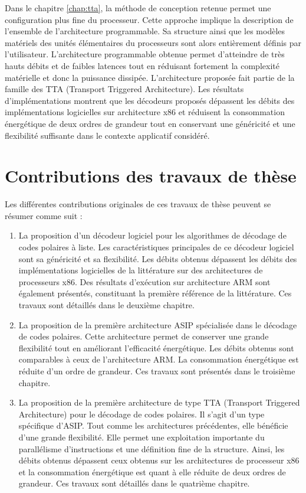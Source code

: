 Dans le chapitre \ref{chap:tta}, la méthode de conception retenue permet une configuration plus fine du processeur. Cette approche implique la description de l'ensemble de l'architecture programmable. Sa structure ainsi que les modèles matériels des unités élémentaires du processeurs sont alors entièrement définis par l'utilisateur. L'architecture programmable obtenue permet d'atteindre de très hauts débits et de faibles latences tout en réduisant fortement la complexité matérielle et donc la puissance dissipée. L'architecture proposée fait partie de la famille des TTA (Transport Triggered Architecture). Les résultats d'implémentations montrent que les décodeurs proposés dépassent les débits des implémentations logicielles sur architecture x86 et réduisent la consommation énergétique de deux ordres de grandeur tout en conservant une généricité et une flexibilité suffisante dans le contexte applicatif considéré.

\section*{Contributions des travaux de thèse}
Les différentes contributions originales de ces travaux de thèse peuvent se résumer comme suit : 
\begin{enumerate}
	\item La proposition d'un décodeur logiciel pour les algorithmes de décodage de codes polaires à liste. Les caractéristiques principales de ce décodeur logiciel sont sa généricité et sa flexibilité. Les débits obtenus dépassent les débits des implémentations logicielles de la littérature sur des architectures de processeurs x86. Des résultats d'exécution sur architecture ARM sont également présentés, constituant la première référence de la littérature. Ces travaux sont détaillés dans le deuxième chapitre.
  	\item La proposition de la première architecture ASIP spécialisée dans le décodage de codes polaires. Cette architecture permet de conserver une grande flexibilité tout en améliorant l'efficacité énergétique. Les débits obtenus sont comparables à ceux de l'architecture ARM. La consommation énergétique est réduite d'un ordre de grandeur. Ces travaux sont présentés dans le troisième chapitre.
  	\item La proposition de la première architecture de type TTA (Transport Triggered Architecture) pour le décodage de codes polaires. Il s'agit d'un type spécifique d'ASIP. Tout comme les architectures précédentes, elle bénéficie d'une grande flexibilité. Elle permet une exploitation importante du parallélisme d'instructions et une définition fine de la structure. Ainsi, les débits obtenus dépassent ceux obtenus sur les architectures de processeur x86 et la consommation énergétique est quant à elle réduite de deux ordres de grandeur. Ces travaux sont détaillés dans le quatrième chapitre.

\end{enumerate}

